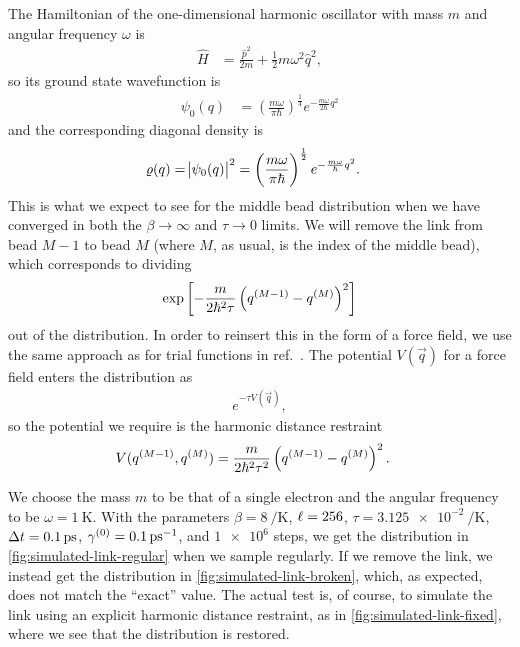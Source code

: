 The Hamiltonian of the one-dimensional harmonic oscillator with mass $m$ and angular frequency $\omega$ is
\begin{align}
	\hat{H}
	&= \frac{\hat{p}^2}{2 m} + \frac{1}{2} m \omega^2 \hat{q}^2,
		\label{eq:harmonic-oscillator-hamiltonian}
\end{align}
so its ground state wavefunction is~\cite[440-441,492]{messiah1999quantum}
\begin{align}
	\psi_0(q)
	&= \left( \frac{m \omega}{\pi \hbar} \right)^\frac{1}{4} e^{-\frac{m \omega}{2 \hbar} q^2}
		\label{eq:ho-position-wf}
\end{align}
and the corresponding diagonal density is
\begin{align}
	\varrho(q)
	&= \abs{\psi_0(q)}^2
	= \left( \frac{m \omega}{\pi \hbar} \right)^\frac{1}{2} e^{-\frac{m \omega}{\hbar} q^2}.
		\label{eq:ho-position-distribution}
\end{align}
This is what we expect to see for the middle bead distribution when we have converged in both the $\beta \to \infty$ and $\tau \to 0$ limits.
We will remove the link from bead $M - 1$ to bead $M$ (where $M$, as usual, is the index of the middle bead), which corresponds to dividing
\begin{align}
	\exp{\left[ -\frac{m}{2 \hbar^2 \tau} \left( q^{(M-1)} - q^{(M)} \right)^2 \right]}
\end{align}
out of the distribution.
In order to reinsert this in the form of a force field, we use the same approach as for trial functions in ref.~\cite{schmidt2014inclusion}.
The potential $V(\vec{q})$ for a force field enters the distribution as
\begin{align}
	e^{-\tau V(\vec{q})},
\end{align}
so the potential we require is the harmonic distance restraint
\begin{align}
	V(q^{(M-1)}, q^{(M)})
	&= \frac{m}{2 \hbar^2 \tau^2} \left( q^{(M-1)} - q^{(M)} \right)^2.
\end{align}

We choose the mass $m$ to be that of a single electron and the angular frequency to be $\omega = \SI{1}{\kelvin}$.
With the parameters $\beta = \SI{8}{\per\kelvin}$, $\ell = 256$, $\tau = \SI{3.125e-2}{\per\kelvin}$, $\dt = \SI{0.1}{\pico\second}$, $\gamma\bead{0} = \SI{0.1}{\per\pico\second}$, and $\num{1e6}$ steps, we get the distribution in \cref{fig:simulated-link-regular} when we sample regularly.
If we remove the link, we instead get the distribution in \cref{fig:simulated-link-broken}, which, as expected, does not match the ``exact'' value.
The actual test is, of course, to simulate the link using an explicit harmonic distance restraint, as in \cref{fig:simulated-link-fixed}, where we see that the distribution is restored.

